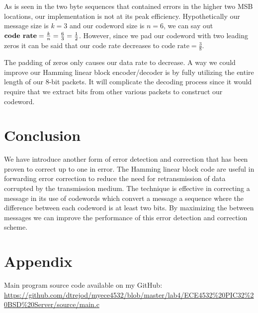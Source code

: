 \documentclass[12pt]{article}
\begin{document}
As is seen in the two byte sequences that contained errors in the higher two
MSB locations, our implementation is not at its peak efficiency. 
Hypothetically our message size is $k=3$ and our codeword size is $n=6$, 
we can say out $\text{\textbf{code rate}} =\frac{k}{n} = \frac{6}{3} = 
\frac{1}{2}$. However, since we pad our codeword with two leading zeros it 
can be said that our code rate decreases to $\text{code rate} = \frac{3}{8}$.

The padding of zeros only causes our data rate to decrease. A way we could
improve our Hamming linear block encoder/decoder is by fully utilizing the 
entire length of our 8-bit packets. It will complicate the decoding process
since it would require that we extract bits from other various packets to 
construct our codeword.

\section{Conclusion}
\label{sect:conclusion} 
We have introduce another form of error detection and correction that has 
been proven to correct up to one in error. The Hamming linear block code 
are useful in forwarding error correction to reduce the need for 
retransmission of data corrupted by the transmission medium. The technique 
is effective in correcting a message in its use of codewords which convert
a message a sequence where the difference between each codeword is at least
two bits. By maximizing the between messages we can improve the performance
of this error detection and correction scheme.




\section*{Appendix}
\label{sect:appendix}
Main program source code available on my GitHub: \\
\url{https://github.com/dtrejod/myece4532/blob/master/lab4/ECE4532%20PIC32%20BSD%20Server/source/main.c}
\end{document}
